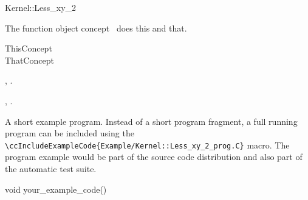 

\begin{ccRefFunctionObjectConcept}{Kernel::Less_xy_2}


\ccDefinition
  
The function object concept \ccRefName\ does this and that.

\ccGeneralizes

ThisConcept \\
ThatConcept

\ccTypes


\ccCreation
{}  %


\ccOperations


\ccHasModels

,
.

\ccSeeAlso

,
.

\ccExample

A short example program.
Instead of a short program fragment, a full running program can be
included using the 
\verb|\ccIncludeExampleCode{Example/Kernel::Less_xy_2_prog.C}| 
macro. The program example would be part of the source code distribution and
also part of the automatic test suite.

\begin{ccExampleCode}
void your_example_code() {
}
\end{ccExampleCode}


\end{ccRefFunctionObjectConcept}


